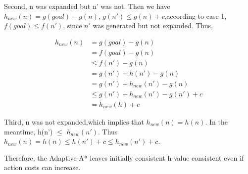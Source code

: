 Second, n was expanded but n' was not. Then we have $h_{new}(n) = g(goal) -
g(n)$, $g(n') \leq g(n) + c $,according to case 1, $f(goal) \leq f(n')$, since
$n'$ was generated but not expanded. Thus,

\begin{equation*}
  \begin{aligned}
   h_{new}(n) &= g(goal) - g(n)\\
   &= f(goal) - g(n)\\
   &\leq f(n') -g(n)\\
   &= g(n') + h(n') -g(n)\\
   &= g(n') + h_{new}(n') -g(n)\\
   &\leq g(n') + h_{new}(n') - g(n') + c\\
   &= h_{new}(h) + c
  \end{aligned}
\end{equation*}

Third, n was not expanded,which implies that $h_{new}(n) = h(n)$. In the
meantime, h(n') $\leq$ $h_{new}(n')$. Thus $h_{new}(n) = h(n) \leq h(n') + c
\leq h_{new}(n') + c$.

Therefore, the Adaptive A* leaves initially consistent h-value consistent even
if action costs can increase.

